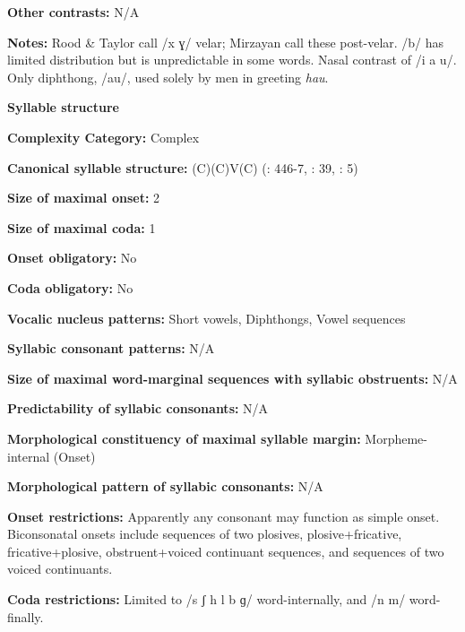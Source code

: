 \textbf{Other contrasts:} N/A



\textbf{Notes:} Rood \& Taylor call /x ɣ/ velar; Mirzayan call these post-velar. /b/ has limited distribution but is unpredictable in some words. Nasal contrast of /i a u/. Only diphthong, /au/, used solely by men in greeting \textit{hau}.



\textbf{Syllable structure}



\textbf{Complexity Category:} Complex



\textbf{Canonical syllable structure:} (C)(C)V(C) (\citealt{TaylorRood1996}: 446-7, \citealt{Mirzayan2010}: 39, \citealt{Ingham2003}: 5)



\textbf{Size of maximal onset:} 2



\textbf{Size of maximal coda:} 1



\textbf{Onset obligatory:} No



\textbf{Coda obligatory:} No



\textbf{Vocalic nucleus patterns:} Short vowels, Diphthongs, Vowel sequences



\textbf{Syllabic consonant patterns:} N/A



\textbf{Size of maximal word{}-marginal sequences with syllabic obstruents:} N/A



\textbf{Predictability of syllabic consonants:} N/A



\textbf{Morphological constituency of maximal syllable margin:} Morpheme-internal (Onset)



\textbf{Morphological pattern of syllabic consonants:} N/A



\textbf{Onset restrictions:} Apparently any consonant may function as simple onset. Biconsonatal onsets include sequences of two plosives, plosive+fricative, fricative+plosive, obstruent+voiced continuant sequences, and sequences of two voiced continuants.



\textbf{Coda restrictions:} Limited to /s ʃ h l b ɡ/ word-internally, and /n m/ word-finally.



